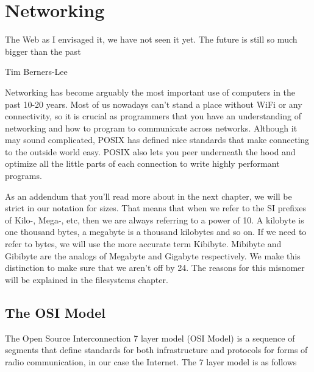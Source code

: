 \chapter{Networking}

\epigraph{The Web as I envisaged it, we have not seen it yet.
  The future is still so much bigger than the past}{Tim Berners-Lee}

Networking has become arguably the most important use of computers in the past 10-20 years.
Most of us nowadays can't stand a place without WiFi or any connectivity, so it is crucial as programmers that you have an understanding of networking and how to program to communicate across networks.
Although it may sound complicated, POSIX has defined nice standards that make connecting to the outside world easy.
POSIX also lets you peer underneath the hood and optimize all the little parts of each connection to write highly performant programs.

As an addendum that you'll read more about in the next chapter, we will be strict in our notation for sizes.
That means that when we refer to the SI prefixes of Kilo-, Mega-, etc, then we are always referring to a power of 10.
A kilobyte is one thousand bytes, a megabyte is a thousand kilobytes and so on.
If we need to refer to  bytes, we will use the more accurate term Kibibyte. Mibibyte and Gibibyte are the analogs of Megabyte and Gigabyte respectively.
We make this distinction to make sure that we aren't off by 24.
The reasons for this misnomer will be explained in the filesystems chapter.

\section{The OSI Model}

The Open Source Interconnection 7 layer model (OSI Model) is a sequence of segments that define standards for both infrastructure and protocols for forms of radio communication, in our case the Internet.
The 7 layer model is as follows

